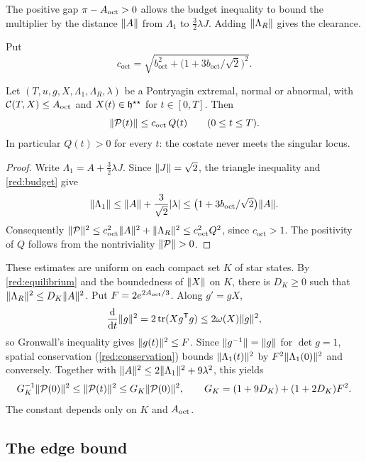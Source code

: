 The positive gap $\pi-A_{\mathrm{oct}}>0$ allows the budget inequality to bound the multiplier by the
distance $\lVert A\rVert$ from $\Lambda_1$ to $\frac32\lambda J$. Adding $\lVert \Lambda_R\rVert$ gives the
clearance.

Put
\[
 c_{\mathrm{oct}}=
 \sqrt{b_{\mathrm{oct}}^2+\bigl(1+3b_{\mathrm{oct}}/\sqrt2\bigr)^2}.
\]

\begin{proposition}\label{prop:clearance}
Let $(T,u,g,X,\Lambda_1,\Lambda_R,\lambda)$ be a Pontryagin extremal, normal or abnormal, with
$\mathcal{C}(T,X)\le A_{\mathrm{oct}}$ and $X(t)\in\mathfrak{h}^{\star\star}$ for $t\in[0,T]$. Then
\[
\lVert \mathcal P(t)\rVert\le c_{\mathrm{oct}}\,Q(t)\qquad(0\le t\le T).
\]
In particular $Q(t)>0$ for every $t$: the costate never meets the singular locus.
\end{proposition}

\begin{proof}
Write $\Lambda_1=A+\frac32\lambda J$. Since $\lVert J\rVert=\sqrt2$, the triangle inequality and
\cref{red:budget} give
\[
 \lVert \Lambda_1\rVert\le\lVert A\rVert+\frac3{\sqrt2}\lvert \lambda\rvert
 \le\bigl(1+3b_{\mathrm{oct}}/\sqrt2\bigr)\lVert A\rVert.
\]
Consequently
$\lVert \mathcal P\rVert^2\le c_{\mathrm{oct}}^2\lVert A\rVert^2+\lVert \Lambda_R\rVert^2
\le c_{\mathrm{oct}}^2Q^2$, since $c_{\mathrm{oct}}>1$.
The positivity of $Q$ follows from the nontriviality
$\lVert \mathcal P\rVert>0$.
\end{proof}

\begin{remark}\label{red:clearance-remark}
These estimates are uniform on each compact set $K$ of star states. By
\cref{red:equilibrium} and the boundedness of $\lVert X\rVert$ on $K$, there is $D_K\ge0$ such that
$\lVert \Lambda_R\rVert^2\le D_K\lVert A\rVert^2$. Put $F=2e^{2A_{\mathrm{oct}}/3}$. Along $g'=gX$,
\[
 \frac{\mathrm{d}}{\mathrm{d} t}\lVert g\rVert^2=2\operatorname{tr}(Xg^{\mathsf T}g)
 \le2\omega(X)\lVert g\rVert^2,
\]
so Gronwall's inequality gives $\lVert g(t)\rVert^2\le F$. Since
$\lVert g^{-1}\rVert=\lVert g\rVert$ for $\det g=1$, spatial conservation
(\cref{red:conservation}) bounds $\lVert \Lambda_1(t)\rVert^2$ by
$F^2\lVert \Lambda_1(0)\rVert^2$ and conversely. Together with
$\lVert A\rVert^2\le2\lVert \Lambda_1\rVert^2+9\lambda^2$, this yields
\[
 G_K^{-1}\lVert \mathcal P(0)\rVert^2\le\lVert \mathcal P(t)\rVert^2
 \le G_K\lVert \mathcal P(0)\rVert^2,
 \qquad G_K=(1+9D_K)+(1+2D_K)F^2.
\]
The constant depends only on $K$ and $A_{\mathrm{oct}}$.
\end{remark}

\subsection{The edge bound}\label{red:edge-sec}


